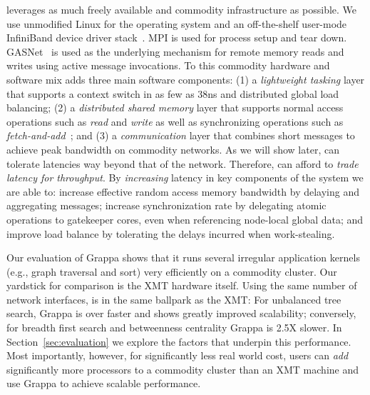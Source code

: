 \Grappa leverages as much freely available and commodity infrastructure as
possible. We use unmodified Linux for the operating system and an
off-the-shelf user-mode InfiniBand device driver stack~\cite{OFED}. MPI is
used for process setup and tear down. GASNet~\cite{gasnet} is used as the
underlying mechanism for remote memory reads and writes using active message
invocations. To this commodity hardware and software mix \Grappa adds three
main software components: (1) a \emph{lightweight tasking\/} layer that
supports a context switch in as few as 38ns and distributed global load
balancing; (2) a \emph{distributed shared memory\/} layer that supports normal
access operations such as \emph{read\/} and \emph{write\/} as well as
synchronizing operations such as \emph{fetch-and-add\/}~\cite{fetchandadd};
and (3) a \emph{communication\/} layer that combines short messages to
achieve peak bandwidth on commodity networks. As we will show later, \Grappa
can tolerate latencies way beyond that of the network. Therefore, \Grappa can
afford to \emph{trade latency for throughput}. By {\em increasing\/} latency
in key components of the system we are able to: increase effective random
access memory bandwidth by delaying and aggregating messages; increase
synchronization rate by delegating atomic operations to gatekeeper cores, even
when referencing node-local global data; and improve load balance by
tolerating the delays incurred when work-stealing.

Our evaluation of Grappa shows that it runs several irregular application
kernels (e.g., graph traversal and sort) very efficiently on a commodity
cluster. Our yardstick for comparison is the XMT hardware itself. Using the
same number of network interfaces, \Grappa is in the same ballpark as the XMT:
For unbalanced tree search, Grappa is over  faster and shows greatly
improved scalability; conversely, for breadth first search and betweenness
centrality Grappa is 2.5X slower. In Section~\ref{sec:evaluation} we explore
the factors that underpin this performance. Most importantly, however, for
significantly less real world cost, users can \emph{add\/} significantly more
processors to a commodity cluster than an XMT machine and use Grappa to
achieve scalable performance. 


